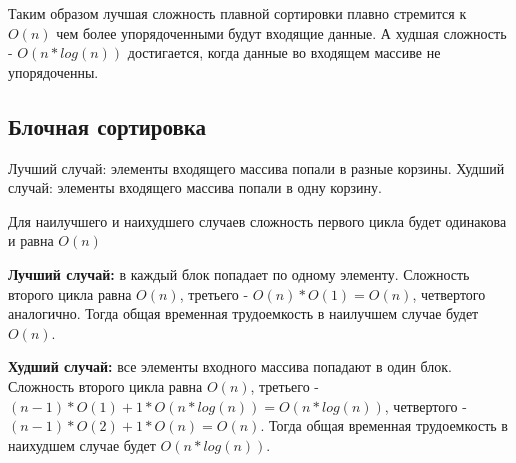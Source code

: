  Таким образом лучшая сложность плавной сортировки плавно стремится к $O(n)$ чем более упорядоченными будут входящие данные. А худшая сложность - $O(n*log(n))$ достигается, когда данные во входящем массиве не упорядоченны. 
 
\subsection{Блочная сортировка} 
Лучший случай: элементы входящего массива попали в разные корзины.
Худший случай: элементы входящего массива попали в одну корзину.

Для наилучшего и наихудшего случаев сложность первого цикла будет одинакова и равна $O(n)$

\textbf{Лучший случай:} в каждый блок попадает по одному элементу. Сложность второго цикла равна $O(n)$, третьего - $O(n) * O(1) = O(n)$, четвертого аналогично. Тогда общая временная трудоемкость в наилучшем случае будет  $O(n)$. 

\textbf{Худший случай:} все элементы входного массива попадают в один блок. Сложность второго цикла равна $O(n)$, третьего - $(n-1)* O(1) + 1 * O(n * log(n)) = O(n * log(n))$, четвертого -  $(n-1)* O(2) + 1 * O(n) = O(n)$. Тогда общая временная трудоемкость в наихудшем случае будет  $O(n * log(n))$. 

